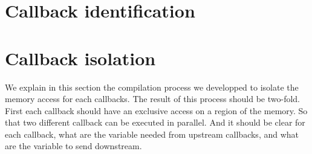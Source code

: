 








\section{Callback identification}

\subsection{}

\section{Callback isolation}

We explain in this section the compilation process we developped to isolate the memory access for each callbacks.
The result of this process should be two-fold. First each callback should have an exclusive access on a region of the memory. So that two different callback can be executed in parallel. And it should be clear for each callback, what are the variable needed from upstream callbacks, and what are the variable to send downstream.


